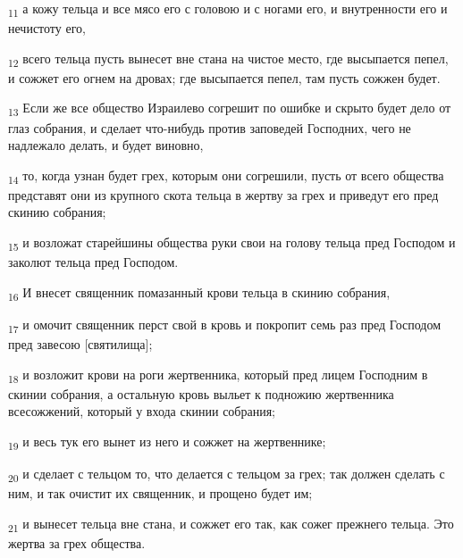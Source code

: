 \begin{tcolorbox}
\textsubscript{11} а кожу тельца и все мясо его с головою и с ногами его, и внутренности его и нечистоту его,
\end{tcolorbox}
\begin{tcolorbox}
\textsubscript{12} всего тельца пусть вынесет вне стана на чистое место, где высыпается пепел, и сожжет его огнем на дровах; где высыпается пепел, там пусть сожжен будет.
\end{tcolorbox}
\begin{tcolorbox}
\textsubscript{13} Если же все общество Израилево согрешит по ошибке и скрыто будет дело от глаз собрания, и сделает что-нибудь против заповедей Господних, чего не надлежало делать, и будет виновно,
\end{tcolorbox}
\begin{tcolorbox}
\textsubscript{14} то, когда узнан будет грех, которым они согрешили, пусть от всего общества представят они из крупного скота тельца в жертву за грех и приведут его пред скинию собрания;
\end{tcolorbox}
\begin{tcolorbox}
\textsubscript{15} и возложат старейшины общества руки свои на голову тельца пред Господом и заколют тельца пред Господом.
\end{tcolorbox}
\begin{tcolorbox}
\textsubscript{16} И внесет священник помазанный крови тельца в скинию собрания,
\end{tcolorbox}
\begin{tcolorbox}
\textsubscript{17} и омочит священник перст свой в кровь и покропит семь раз пред Господом пред завесою [святилища];
\end{tcolorbox}
\begin{tcolorbox}
\textsubscript{18} и возложит крови на роги жертвенника, который пред лицем Господним в скинии собрания, а остальную кровь выльет к подножию жертвенника всесожжений, который у входа скинии собрания;
\end{tcolorbox}
\begin{tcolorbox}
\textsubscript{19} и весь тук его вынет из него и сожжет на жертвеннике;
\end{tcolorbox}
\begin{tcolorbox}
\textsubscript{20} и сделает с тельцом то, что делается с тельцом за грех; так должен сделать с ним, и так очистит их священник, и прощено будет им;
\end{tcolorbox}
\begin{tcolorbox}
\textsubscript{21} и вынесет тельца вне стана, и сожжет его так, как сожег прежнего тельца. Это жертва за грех общества.
\end{tcolorbox}

